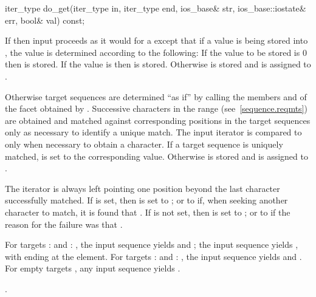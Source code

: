 %
\begin{itemdecl}
iter_type do_get(iter_type in, iter_type end, ios_base& str,
                 ios_base::iostate& err, bool& val) const;
\end{itemdecl}

\begin{itemdescr}
\pnum
\effects
If
then input proceeds as it would for a
except that if a value is being stored into ,
the value is determined according to the following:
If the value to be stored is 0 then
is stored.
If the value is 
then
is stored.
Otherwise  is stored and  is assigned to .

\pnum
Otherwise target sequences are determined ``as if'' by calling the
members
and
of the facet obtained by
.
Successive characters in the range
(see~\ref{sequence.reqmts}) are obtained and
matched against corresponding positions in the target sequences only
as necessary to identify a unique match. The input iterator  is
compared to  only when necessary to obtain a character. If a target sequence is uniquely matched,  is set to the
corresponding value. Otherwise  is stored and  is assigned to .

\pnum
The  iterator is always left pointing one position beyond the last
character successfully matched. If  is set, then  is set to
;
or to
if, when seeking another character to match, it is found that
.
If  is not set, then  is set to
;
or to
if the reason for the failure was that
.
\begin{example}
For targets
:
and
:
,
the input sequence
yields
and
;
the input sequence
yields
,
with  ending at the
element. For targets
:
and
:
, the input sequence  yields
and
.
For empty targets , any input sequence yields
.
\end{example}

\pnum
\returns
{}.
\end{itemdescr}

